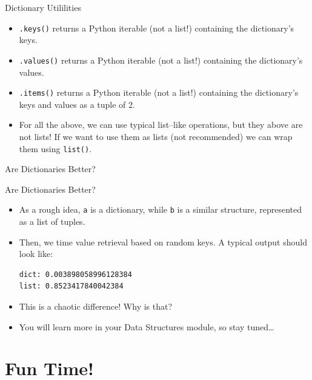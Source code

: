 \documentclass[aspectratio=169, 12pt, xcolor=table]{beamer}
\newcounter{exno}
\begin{document}
	\begin{frame}{Dictionary Utililities}
		\begin{itemize}
			\item \texttt{.keys()} returns a Python iterable (not a list!) containing the dictionary's keys.
			\item \texttt{.values()} returns a Python iterable (not a list!) containing the dictionary's values.
			\item \texttt{.items()} returns a Python iterable (not a list!) containing the dictionary's keys and values as a tuple of 2.
			\item For all the above, we can use typical list--like operations, but they above are not lists! If we want to use them as lists (not recommended) we can wrap them using \texttt{list()}.
		\end{itemize}
	\end{frame}

	\begin{frame}{Are Dictionaries Better?}
		
	\end{frame}

	\begin{frame}[fragile]{Are Dictionaries Better?}
		\begin{itemize}
			\item As a rough idea, \texttt{a} is a dictionary, while \texttt{b} is a similar structure, represented as a list of tuples.\pause
			\item Then, we time value retrieval based on random keys. A typical output should look like:
			\begin{lstlisting}
dict: 0.003898058996128384
list: 0.8523417840042384
\end{lstlisting}\pause
			\item This is a chaotic difference! Why is that?\pause
			\item You will learn more in your Data Structures module, so stay tuned\ldots
		\end{itemize}
	\end{frame}
	
	\section{Fun Time!}\label{sec:fun-time}
	
	\sectionframe
	
	\setcounter{exno}{0}
	
\end{document}
